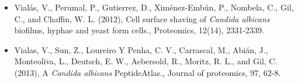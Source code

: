 \begin{otherlanguage}{british}
\begin{itemize}[leftmargin=*]
\item[]{%
Vial\'as, V., Perumal, P., Gutierrez, D., Xim\'enez-Emb\'un, P., Nombela, C., Gil, C., and Chaffin,
W. L. (2012), Cell surface shaving of \textit{Candida albicans} biofilms, hyphae and yeast form
cells., Proteomics, 12(14), 2331-2339.
}

\item[]{%
Vialas, V., Sun, Z., Loureiro Y Penha, C. V., Carrascal, M., Abi\'an, J., Monteoliva, L., Deutsch,
E. W., Aebersold, R., Moritz, R. L., and Gil, C. (2013), A \textit{Candida albicans} PeptideAtlas.,
Journal of proteomics, 97, 62-8.
}


\end{itemize}


\end{otherlanguage}